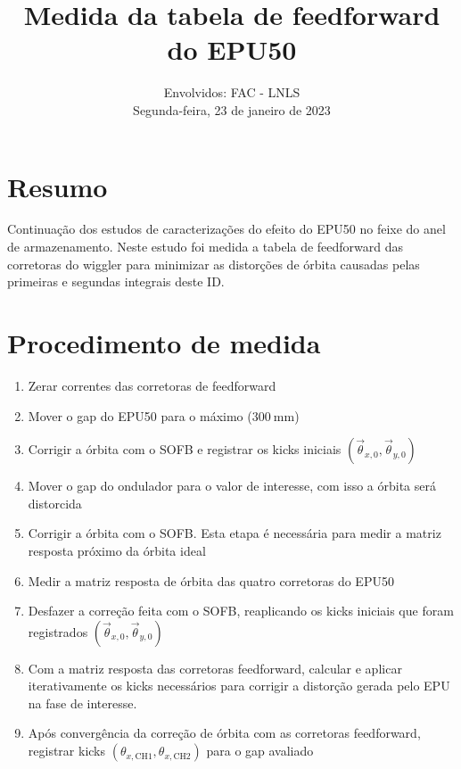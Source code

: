 \documentclass[a4paper,
               keeplastbox,   %
               ]{jacow}
\begin{document}
\title{Medida da tabela de feedforward do EPU50}

\author{Envolvidos: FAC - LNLS \\ Segunda-feira, 23 de janeiro de 2023}
\maketitle
%
\section{Resumo}
Continuação dos estudos de caracterizações do efeito do EPU50 no feixe do anel de armazenamento. Neste estudo foi medida a tabela de feedforward das corretoras do wiggler para minimizar as distorções de órbita causadas pelas primeiras e segundas integrais deste ID. 

\section{Procedimento de medida}

\begin{enumerate}
    \item Zerar correntes das corretoras de feedforward
    \item Mover o gap do EPU50 para o máximo ($\SI{300}{\milli\meter}$)
    \item Corrigir a órbita com o SOFB e registrar os kicks iniciais $\left(\vec{\theta}_{x, 0}, \vec{\theta}_{y, 0}\right)$
    \item Mover o gap do ondulador para o valor de interesse, com isso a órbita será distorcida
    \item Corrigir a órbita com o SOFB. Esta etapa é necessária para medir a matriz resposta próximo da órbita ideal
    \item Medir a matriz resposta de órbita das quatro corretoras do EPU50
    \item Desfazer a correção feita com o SOFB, reaplicando os kicks iniciais que foram registrados $\left(\vec{\theta}_{x, 0}, \vec{\theta}_{y, 0}\right)$
    \item Com a matriz resposta das corretoras feedforward, calcular e aplicar iterativamente os kicks necessários para corrigir a distorção gerada pelo EPU na fase de interesse. 
    \item Após convergência da correção de órbita com as corretoras feedforward, registrar kicks $\left(\theta_{x, \mathrm{CH1}},\theta_{x, \mathrm{CH2}}\right)$ para o gap avaliado
\end{enumerate}
\end{document}
